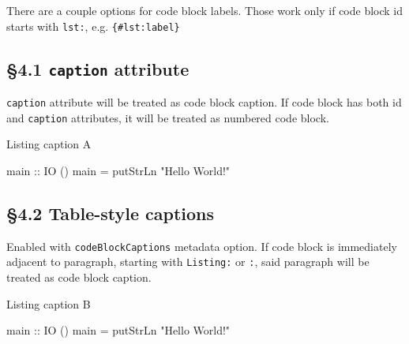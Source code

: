 \documentclass[]{article}
\newenvironment{Shaded}{}{}
\newcommand{\DataTypeTok}[1]{\textcolor[rgb]{0.56,0.13,0.00}{#1}}
\newcommand{\FunctionTok}[1]{\textcolor[rgb]{0.02,0.16,0.49}{#1}}
\newcommand{\NormalTok}[1]{#1}
\newcommand{\OtherTok}[1]{\textcolor[rgb]{0.00,0.44,0.13}{#1}}
\newcommand{\StringTok}[1]{\textcolor[rgb]{0.25,0.44,0.63}{#1}}
\begin{document}
There are a couple options for code block labels. Those work only if
code block id starts with \texttt{lst:}, e.g. \texttt{\{\#lst:label\}}

\hypertarget{sec:caption-attr}{%
\subsection{\texorpdfstring{§4.1 \texttt{caption}
attribute}{§4.1 caption attribute}}\label{sec:caption-attr}}

\texttt{caption} attribute will be treated as code block caption. If
code block has both id and \texttt{caption} attributes, it will be
treated as numbered code block.

\begin{codelisting}
\caption{Listing caption A}

\hypertarget{lst:captionAttr}{%
\label{lst:captionAttr}}%
\begin{Shaded}
\begin{Highlighting}[]
\OtherTok{main ::} \DataTypeTok{IO}\NormalTok{ ()}
\NormalTok{main }\FunctionTok{=}\NormalTok{ putStrLn }\StringTok{"Hello World!"}
\end{Highlighting}
\end{Shaded}

\end{codelisting}

\hypertarget{sec:table-capts}{%
\subsection{§4.2 Table-style captions}\label{sec:table-capts}}

Enabled with \texttt{codeBlockCaptions} metadata option. If code block
is immediately adjacent to paragraph, starting with \texttt{Listing:} or
\texttt{:}, said paragraph will be treated as code block caption.

\begin{codelisting}

\caption{Listing caption B}

\hypertarget{lst:tableCaption}{%
\label{lst:tableCaption}}%
\begin{Shaded}
\begin{Highlighting}[]
\OtherTok{main ::} \DataTypeTok{IO}\NormalTok{ ()}
\NormalTok{main }\FunctionTok{=}\NormalTok{ putStrLn }\StringTok{"Hello World!"}
\end{Highlighting}
\end{Shaded}

\end{codelisting}
\end{document}
